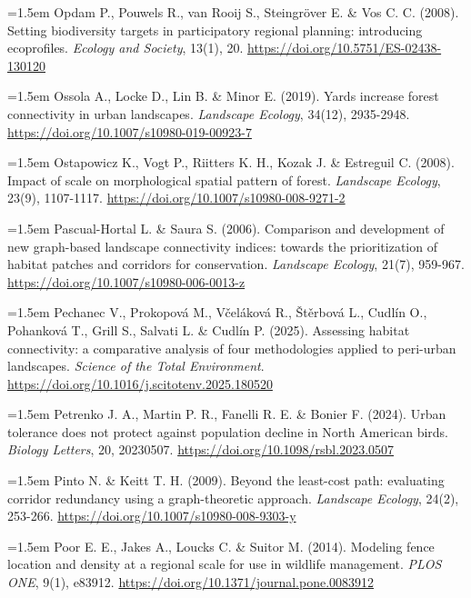 \documentclass[a4paper,12pt]{report}
\begin{document}
\noindent\hangindent=1.5em Opdam P., Pouwels R., van Rooij S., Steingröver E. \& Vos C. C. (2008). Setting biodiversity targets in participatory regional planning: introducing ecoprofiles. \textit{Ecology and Society}, 13(1), 20. \url{https://doi.org/10.5751/ES-02438-130120}\par\medskip
\noindent\hangindent=1.5em Ossola A., Locke D., Lin B. \& Minor E. (2019). Yards increase forest connectivity in urban landscapes. \textit{Landscape Ecology}, 34(12), 2935-2948. \url{https://doi.org/10.1007/s10980-019-00923-7}\par\medskip
\noindent\hangindent=1.5em Ostapowicz K., Vogt P., Riitters K. H., Kozak J. \& Estreguil C. (2008). Impact of scale on morphological spatial pattern of forest. \textit{Landscape Ecology}, 23(9), 1107-1117. \url{https://doi.org/10.1007/s10980-008-9271-2}\par\medskip
\noindent\hangindent=1.5em Pascual-Hortal L. \& Saura S. (2006). Comparison and development of new graph-based landscape connectivity indices: towards the prioritization of habitat patches and corridors for conservation. \textit{Landscape Ecology}, 21(7), 959-967. \url{https://doi.org/10.1007/s10980-006-0013-z}\par\medskip
\noindent\hangindent=1.5em Pechanec V., Prokopová M., Včeláková R., Štěrbová L., Cudlín O., Pohanková T., Grill S., Salvati L. \& Cudlín P. (2025). Assessing habitat connectivity: a comparative analysis of four methodologies applied to peri-urban landscapes. \textit{Science of the Total Environment}. \url{https://doi.org/10.1016/j.scitotenv.2025.180520}\par\medskip
\noindent\hangindent=1.5em Petrenko J. A., Martin P. R., Fanelli R. E. \& Bonier F. (2024). Urban tolerance does not protect against population decline in North American birds. \textit{Biology Letters}, 20, 20230507. \url{https://doi.org/10.1098/rsbl.2023.0507}\par\medskip
\noindent\hangindent=1.5em Pinto N. \& Keitt T. H. (2009). Beyond the least-cost path: evaluating corridor redundancy using a graph-theoretic approach. \textit{Landscape Ecology}, 24(2), 253-266. \url{https://doi.org/10.1007/s10980-008-9303-y}\par\medskip
\noindent\hangindent=1.5em Poor E. E., Jakes A., Loucks C. \& Suitor M. (2014). Modeling fence location and density at a regional scale for use in wildlife management. \textit{PLOS ONE}, 9(1), e83912. \url{https://doi.org/10.1371/journal.pone.0083912}\par\medskip
\end{document}
